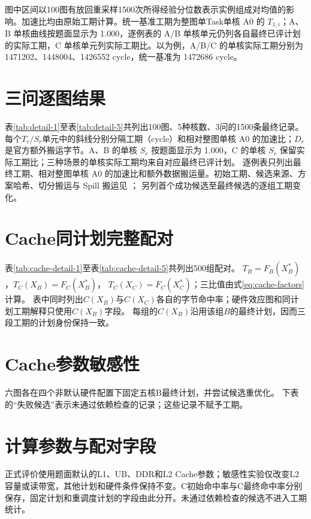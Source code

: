 图中区间以100图有放回重采样1500次所得经验分位数表示实例组成对均值的影响。加速比均由原始工期计算。统一基准工期为整图单Task单核 A0 的 $T_{1,i}$；A、B 单核曲线按题面显示为 1.000，逐例表的 A/B 单核单元仍列各自最终已评计划的实际工期，C 单核单元列实际工期比。以为例，A/B/C 的单核实际工期分别为 1471202、1448004、1426552 cycle，统一基准为 1472686 cycle。

\section{三问逐图结果}\label{app:results}
表\ref{tab:detail-1}至表\ref{tab:detail-5}共列出100图、5种核数、3问的1500条最终记录。
每个$T_r/S_r$单元中的斜线分别分隔工期（cycle）和相对整图单核 A0 的加速比；$D_r$是官方额外搬运字节。A、B 的单核 $S_r$ 按题面显示为 1.000，C 的单核 $S_r$ 保留实际工期比；三种场景的单核实际工期均来自对应最终已评计划。
逐例表只列出最终工期、相对整图单核 A0 的加速比和额外数据搬运量。初始工期、候选来源、方案哈希、切分搬运与 Spill 搬运见 ； 另列首个成功候选至最终候选的逐组工期变化。
\begingroup
\small
\setlength{\tabcolsep}{2.5pt}
\setlength{\LTleft}{\fill}\setlength{\LTright}{\fill}
\renewcommand{\arraystretch}{1.03}

\endgroup

\section{Cache同计划完整配对}\label{app:cache}
表\ref{tab:cache-detail-1}至表\ref{tab:cache-detail-5}共列出500组配对。
$T_B=F_B(X_B^*)$，$T_C(X_B)=F_C(X_B^*)$，
$T_C(X_C)=F_C(X_C^*)$；三比值由式\eqref{eq:cache-factors}计算。
表中同时列出$C(X_B)$与$C(X_C)$各自的字节命中率；硬件效应图和同计划工期解释只使用$C(X_B)$字段。
每组的$C(X_B)$沿用该组$B$的最终计划，因而三段工期的计划身份保持一致。
\begingroup
\scriptsize
\setlength{\tabcolsep}{2pt}
\setlength{\LTleft}{\fill}\setlength{\LTright}{\fill}
\renewcommand{\arraystretch}{1.03}

\endgroup

\section{Cache参数敏感性}\label{app:sensitivity}
六图各在四个非默认硬件配置下固定五核B最终计划，并尝试候选重优化。
下表的“失败候选”表示未通过依赖检查的记录；这些记录不赋予工期。
\begingroup
\small
\setlength{\tabcolsep}{4.5pt}
\renewcommand{\arraystretch}{0.94}
\setlength{\LTleft}{\fill}\setlength{\LTright}{\fill}

\endgroup

\section{计算参数与配对字段}
正式评价使用题面默认的L1、UB、DDR和L2 Cache参数；敏感性实验仅改变L2容量或读带宽，其他计划和硬件条件保持不变。C初始命中率与C最终命中率分别保存，固定计划和重调度计划的字段由此分开。未通过依赖检查的候选不进入工期统计。
